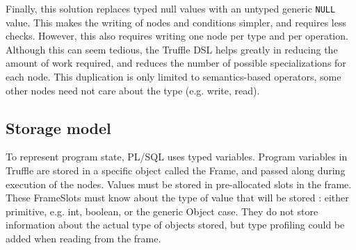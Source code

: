\documentclass[twoside,11pt,a4paper]{article}
\newcommand{\maybe}[1]{\textit{(maybe ? #1)}}
\newcommand{\java}[1]{\textsf{#1}}
\newcommand{\pls}[1]{\small\texttt{#1}\normalsize}
\newcommand{\plsnull}{\pls{NULL}}
\begin{document}
Finally, this solution replaces typed null values with an untyped generic \plsnull{} value. This makes the writing of nodes and conditions simpler, and requires less checks. However, this also requires writing one node per type and per operation. Although this can seem tedious, the Truffle DSL helps greatly in reducing the amount of work required, and reduces the number of possible specializations for each node. This duplication is only limited to semantics-based operators, some other nodes need not care about the type (e.g. write, read).

\subsection{Storage model}


To represent program state, PL/SQL uses typed variables. Program variables in Truffle are stored in a specific object called the \java{Frame}, and passed along during execution of the nodes. Values must be stored in pre-allocated slots in the frame. These \java{FrameSlot}s must know about the type of value that will be stored : either primitive, e.g. \java{int}, \java{boolean}, or the generic \java{Object} case. They do not store information about the actual type of objects stored, but type profiling could be added when reading from the frame.
\end{document}
